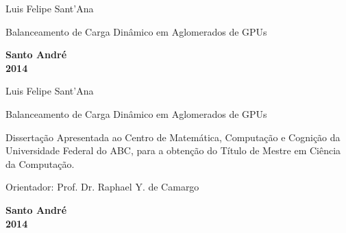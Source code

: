 \begin{titlepage}

\begin{center}
{\LARGE Luis Felipe Sant'Ana}
\par
\vspace{200pt}
{\Huge  Balanceamento de Carga Dinâmico em Aglomerados de GPUs }
\par
\vfill
\textbf{{\large Santo André}\\
{\large 2014}}
\end{center}
\end{titlepage}

\pagestyle{empty}
\cleardoublepage


\begin{center}
{\LARGE Luis Felipe Sant'Ana}
\par
\vspace{200pt}
{\Huge  Balanceamento de Carga Dinâmico em Aglomerados de GPUs}
\end{center}
\par
\vspace{90pt}
\hspace*{175pt}\parbox{7.8cm}{{\large Dissertação Apresentada ao Centro de Matemática, Computação e 
Cognição da Universidade Federal do ABC, para a obtenção do Título de Mestre em Ciência da Computação.}}

\par
\vspace{1em}
\hspace*{175pt}\parbox{7.6cm}{{\large Orientador: Prof. Dr. Raphael Y. de Camargo}}

\par
\vfill
\begin{center}
\textbf{{\large Santo André}\\
{\large 2014}}
\end{center}

\newpage

